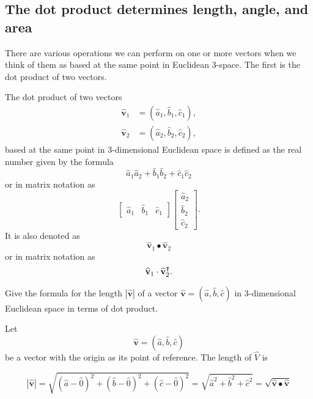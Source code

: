 \documentclass[newpage,hints,handout]{ximera}
\begin{document}
\subsection*{The dot product determines length, angle, and area}

There are various operations we can perform on one or more vectors when we
think of them as based at the same point in Euclidean $3$-space. The
first is the dot product of two vectors.

\begin{definition}
The dot product of two vectors%
\begin{align*}
\hat{\mathbf v}_{1}  &  =(\hat{a}_{1},\hat{b}_{1},\hat{c}_{1}), \\
\hat{\mathbf v}_{2}  &  =(\hat{a}_{2},\hat{b}_{2},\hat{c}_{2}),
\end{align*}
based at the same point in 3-dimensional Euclidean space is
defined as the real number given by the formula%
\[
\hat{a}_{1}\hat{a}_{2}+\hat{b}_{1}\hat{b}_{2}+\hat{c}_{1}\hat{c}_{2}%
\]
or in matrix notation as%
\[
\begin{bmatrix}
\hat{a}_{1} & \hat{b}_{1} & \hat{c}_{1}%
\end{bmatrix}
\begin{bmatrix}
\hat{a}_{2}\\
\hat{b}_{2}\\
\hat{c}_{2}%
\end{bmatrix}.
\]
It is also denoted as%
\[
\hat{\mathbf v}_{1}\bullet\hat{\mathbf v}_{2}%
\]
or in matrix notation as%
\[
\widehat{\mathbf v}_{1}\cdot \widehat{\mathbf v}_{2}^\intercal.
\]

\end{definition}

\begin{problem}
  Give the formula for the length $\left\vert \hat{\mathbf v}\right\vert $ of a
  vector $\hat{\mathbf v}=(\hat{a},\hat{b},\hat{c})$ in 3-dimensional
  Euclidean space in terms of dot product.

\begin{onlineOnly}
\end{onlineOnly}

\begin{freeResponse}
Let 
\[
\hat{\mathbf v}=\left(  \hat{a},\hat{b},\hat{c}\right)
\]
be a vector with the origin as its point of reference. The length of $\hat{V}$ is

\[
\left\vert \hat{\mathbf v}\right\vert=\sqrt{(\hat{a}-\hat{0})^{2}+
  (\hat{b}-\hat{0})^{2}+(\hat{c}-\hat{0})^{2}} \label{0}
= \sqrt{\hat{a}^2+\hat{b}^2+\hat{c}^2}=\sqrt{\hat{\mathbf v}\bullet\hat{\mathbf v}}
\]
\end{freeResponse}
\end{problem}
\end{document}
